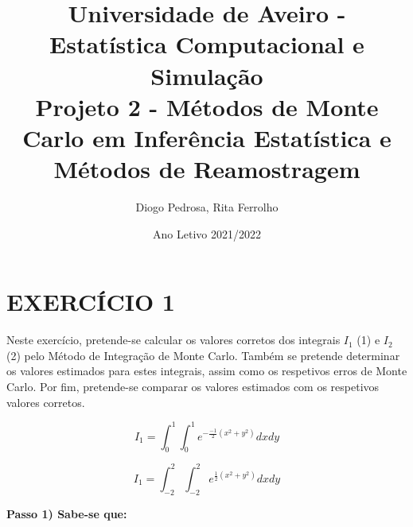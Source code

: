 \documentclass[letterpaper,11pt]{article}
\begin{document}
\title{Universidade de Aveiro - Estatística Computacional e Simulação \\\textbf{Projeto 2 - Métodos de Monte Carlo em Inferência Estatística e Métodos de Reamostragem}}
\author{Diogo Pedrosa, Rita Ferrolho}
\date{Ano Letivo 2021/2022}
\maketitle


\section*{EXERCÍCIO 1} %

Neste exercício, pretende-se calcular os valores corretos dos integrais $I_1$ (1) e $I_2$ (2) pelo Método de Integração de Monte Carlo. Também se pretende determinar os valores estimados para estes integrais, assim como os respetivos erros de Monte Carlo. Por fim, pretende-se comparar os valores estimados com os respetivos valores corretos.

\begin{equation} 
I_1 = \int_0^1 \int_0^1 e^{-\frac{-1}{2}(x^2+y^2)}dxdy
\end{equation}

\begin{equation} 
I_1 = \int_{-2}^{2} \int_{-2}^{2} e^{\frac{1}{2}(x^2+y^2)}dxdy
\end{equation}

\textbf{Passo 1) Sabe-se que:}
\end{document}
